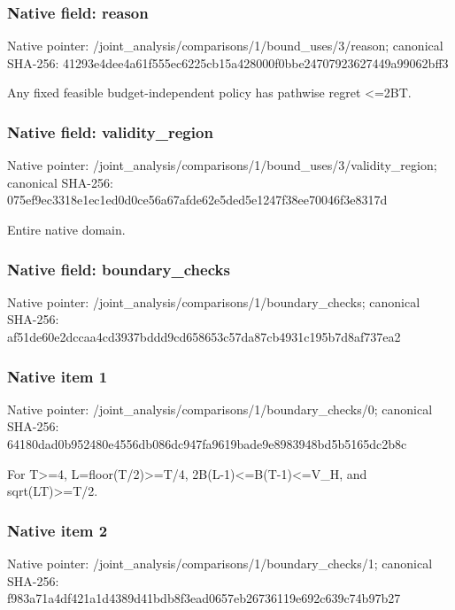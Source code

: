 \documentclass[10pt,a4paper]{article}
\begin{document}
\subsubsection{Native field: reason}
Native pointer: /joint\_\allowbreak{}analysis/comparisons/1/bound\_\allowbreak{}uses/3/reason; canonical SHA-256: 41293e4dee4a61f555ec6225cb15a428000f0bbe24707923627449a99062bff3

\begingroup\raggedright\sloppy Any fixed feasible budget-independent policy has pathwise regret <=\allowbreak{}2BT.\par\endgroup

\subsubsection{Native field: validity\_\allowbreak{}region}
Native pointer: /joint\_\allowbreak{}analysis/comparisons/1/bound\_\allowbreak{}uses/3/validity\_\allowbreak{}region; canonical SHA-256: 075ef9ec3318e1ec1ed0d0ce56a67afde62e5ded5e1247f38ee70046f3e8317d

\begingroup\raggedright\sloppy Entire native domain.\par\endgroup

\subsubsection{Native field: boundary\_\allowbreak{}checks}
Native pointer: /joint\_\allowbreak{}analysis/comparisons/1/boundary\_\allowbreak{}checks; canonical SHA-256: af51de60e2dccaa4cd3937bddd9cd658653c57da87cb4931c195b7d8af737ea2

\subsubsection{Native item 1}
Native pointer: /joint\_\allowbreak{}analysis/comparisons/1/boundary\_\allowbreak{}checks/0; canonical SHA-256: 64180dad0b952480e4556db086dc947fa9619bade9e8983948bd5b5165dc2b8c

\begingroup\raggedright\sloppy For T>=\allowbreak{}4,\allowbreak{} L=\allowbreak{}floor(T/\allowbreak{}2)>=\allowbreak{}T/\allowbreak{}4,\allowbreak{} 2B(L-1)<=\allowbreak{}B(T-1)<=\allowbreak{}V\_\allowbreak{}H,\allowbreak{} and sqrt(LT)>=\allowbreak{}T/\allowbreak{}2.\par\endgroup

\subsubsection{Native item 2}
Native pointer: /joint\_\allowbreak{}analysis/comparisons/1/boundary\_\allowbreak{}checks/1; canonical SHA-256: f983a71a4df421a1d4389d41bdb8f3ead0657eb26736119e692c639c74b97b27
\end{document}
